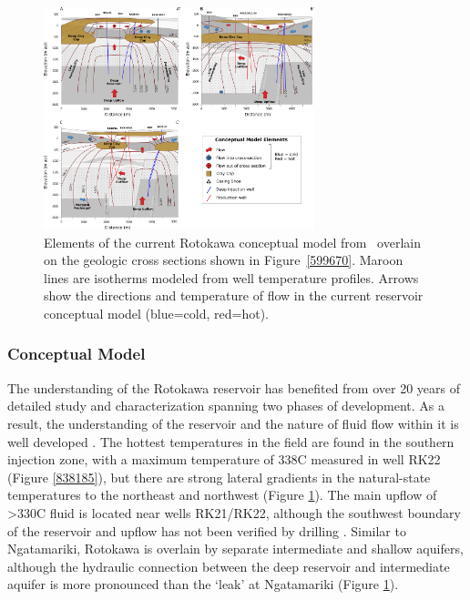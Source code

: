 \begin{figure}
\begin{center}
\includegraphics[width=0.7\textwidth,height=0.7\textheight,keepaspectratio]{Chapter_1_Intro/figures/Rotokawa_conceptual_11-22/Rotokawa_conceptual_2-20}
\caption{{Elements of the current Rotokawa conceptual model
from~\protect\citet{Sewell_2015} overlain on the geologic cross sections shown in
Figure~{\ref{599670}}. Maroon lines are isotherms
modeled from well temperature profiles. Arrows show the directions and
temperature of flow in the current reservoir conceptual model
(blue=cold, red=hot).
{\label{889233}}%
}}
\end{center}
\end{figure}

\subsubsection{Conceptual Model}
The understanding of the Rotokawa reservoir has benefited from over 20 years of detailed study and characterization spanning two phases of development. As a result, the understanding of the reservoir and the nature of fluid flow within it is well developed \citep{Sewell_2015,Addison_2017stanford,wallis2013}. The hottest temperatures in the field are found in the southern injection zone, with a maximum temperature of 338\textdegree C measured in well RK22 (Figure \ref{838185}), but there are strong lateral gradients in the natural-state temperatures to the northeast and northwest \citep{Sewell_2015,wallis2013} (Figure \ref{889233}). The main upflow of \textgreater330\textdegree C fluid is located near wells RK21\slash{RK22}, although the southwest boundary of the reservoir and upflow has not been verified by drilling \citep{Sewell_2015,winick2011natural}. Similar to Ngatamariki, Rotokawa is overlain by separate intermediate and shallow aquifers, although the hydraulic connection between the deep reservoir and intermediate aquifer is more pronounced than the `leak' at Ngatamariki \citep{winick2011natural} (Figure \ref{889233}).

